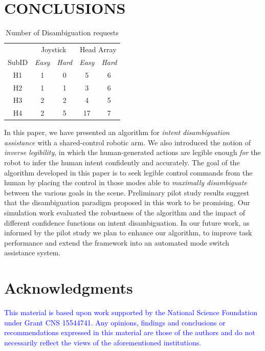\documentclass[conference]{IEEEtran}
\begin{document}
\section{CONCLUSIONS}\label{DC}
\begin{table}[t]
	\centering
	\begin{tabular}{ccccc}
		\toprule
		&\multicolumn{2}{c}{Joystick}
		&
		\multicolumn{2}{c}{Head Array} \\\cmidrule(r){2-3}\cmidrule(l){4-5}
		SubID &\textit{Easy}& \textit{Hard}    & \textit{Easy} &\textit{Hard}      \\
		\bottomrule
		H1 &1& 0   & 5 & 6  \\
		\bottomrule
		H2 &1& 1    & 3 & 6      \\
		\bottomrule
		H3 &2& 2    & 4 &5    \\
		\bottomrule
		H4 &2& 5    & 17 &7   \\
		\bottomrule
	\end{tabular}
	\vspace{.2cm}
	\caption{Number of Disambiguation requests}
	\label{ONDEMAND}
\end{table}
In this paper, we have presented an algorithm for \textit{intent disambiguation assistance} with a shared-control robotic arm. We also introduced the notion of \textit{inverse legibility}, in which the human-generated actions are legible enough \textit{for} the robot to infer the human intent confidently and accurately. The goal of the algorithm developed in this paper is to seek legible control commands from the human by placing the control in those modes able to \textit{maximally disambiguate} between the various goals in the scene. Preliminary pilot study results  suggest that the disambiguation paradigm proposed in this work to be promising. Our simulation work evaluated the robustness of the algorithm and the impact of different confidence functions on intent disambiguation. In our future work, as informed by the pilot study we plan to enhance our algorithm, to improve task performance and extend the framework into an automated mode switch assistance system. 

\section*{Acknowledgments}
\textcolor{blue}{This material is based upon work supported by the National Science Foundation under Grant CNS 15544741. Any opinions, findings and conclusions or
recommendations expressed in this material are those of the authors and do
not necessarily reflect the views of the aforementioned institutions.}
%
\end{document}
